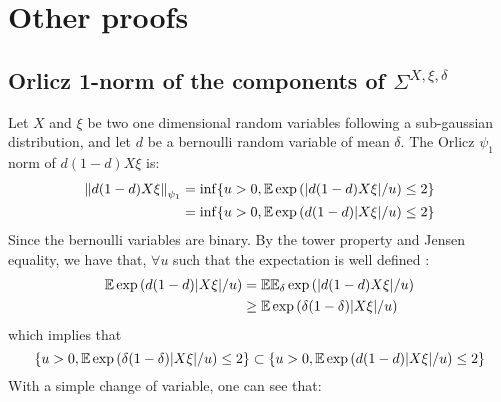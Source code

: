 \documentclass{article}
\numberwithin{equation}{section}
\numberwithin{equation}{section}
\begin{document}
            
\section{Other proofs}
        
        \subsection[Orlicz 1-norm of the components of the covariance between contaminated and uncontaminated data]{Orlicz 1-norm of the components of $\Sigma^{X, \xi, \delta}$}
        \label{proof:orlicz_bernoulli}
            
            Let $X$ and $\xi$ be two one dimensional random variables following a sub-gaussian distribution, and let $d$ be a bernoulli random variable of mean $\delta$. The Orlicz $\psi_1$ norm of $d (1-d) X \xi$ is:
            \begin{equation}
                \begin{split}
                \left\Vert d (1-d) X \xi \right\Vert_{\psi_{1}} & = \inf \lbrace u> 0, \mathbb{E}\exp\left(\vert d (1-d) X \xi \vert / u \right) \leq 2 \rbrace\\
                    & = \inf \lbrace u> 0, \mathbb{E}\exp\left(d (1-d)\vert X \xi \vert / u \right) \leq 2 \rbrace
                    \end{split}
            \end{equation}
            Since the bernoulli variables are binary. By the tower property and Jensen equality, we have that, $\forall u$ such that the expectation is well defined :
            \begin{equation}
                \begin{split}
                \mathbb{E}\exp\left(d (1-d) \vert X \xi \vert / u \right) & = \mathbb{E}\mathbb{E}_\delta \exp\left(\vert d (1-d) X \xi \vert / u \right)\\
                & \geq \mathbb{E}\exp\left(\delta(1-\delta)\vert X \xi \vert / u \right)
                \end{split}
            \end{equation}
            which implies that
            \begin{equation}
                \lbrace u> 0, \mathbb{E}\exp\left(\delta (1-\delta)\vert X \xi \vert / u \right) \leq 2 \rbrace \subset \lbrace u> 0, \mathbb{E}\exp\left(d (1-d)\vert X \xi \vert / u \right) \leq 2 \rbrace 
            \end{equation}
            With a simple change of variable, one can see that:
\end{document}
